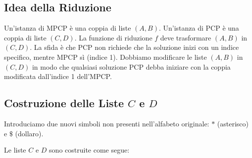 \documentclass[a4paper]{article}
\theoremstyle{definition} %
\theoremstyle{remark} %
\begin{document}
\subsection{Idea della Riduzione}
Un'istanza di MPCP è una coppia di liste $(A, B)$. Un'istanza di PCP è una coppia di liste $(C, D)$.
La funzione di riduzione $f$ deve trasformare $(A, B)$ in $(C, D)$.
La sfida è che PCP non richiede che la soluzione inizi con un indice specifico, mentre MPCP sì (indice 1). Dobbiamo modificare le liste $(A, B)$ in $(C, D)$ in modo che qualsiasi soluzione PCP debba iniziare con la coppia modificata dall'indice 1 dell'MPCP.

\subsection{Costruzione delle Liste $C$ e $D$}
Introduciamo due nuovi simboli non presenti nell'alfabeto originale: $*$ (asterisco) e $\$$ (dollaro).

Le liste $C$ e $D$ sono costruite come segue:
\end{document}

